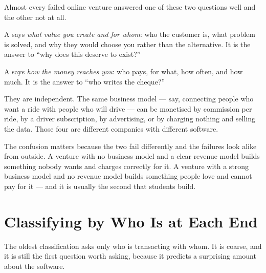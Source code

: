 Almost every failed online venture answered one of these two questions well and
the other not at all.

\begin{definitionbox}
A  says \emph{what value you create and for whom}: who the
customer is, what problem is solved, and why they would choose you rather than
the alternative. It is the answer to ``why does this deserve to exist?''

\smallskip
A  says \emph{how the money reaches you}: who pays, for
what, how often, and how much. It is the answer to ``who writes the cheque?''

\smallskip
They are independent. The same business model --- say, connecting people who
want a ride with people who will drive --- can be monetised by commission per
ride, by a driver subscription, by advertising, or by charging nothing and
selling the data. Those four are different companies with different software.
\end{definitionbox}

The confusion matters because the two fail differently and the failures look
alike from outside. A venture with no business model and a clear revenue model
builds something nobody wants and charges correctly for it. A venture with a
strong business model and no revenue model builds something people love and
cannot pay for it --- and it is usually the second that students build.

\section{Classifying by Who Is at Each End}

The oldest classification asks only who is transacting with whom. It is coarse,
and it is still the first question worth asking, because it predicts a
surprising amount about the software.

